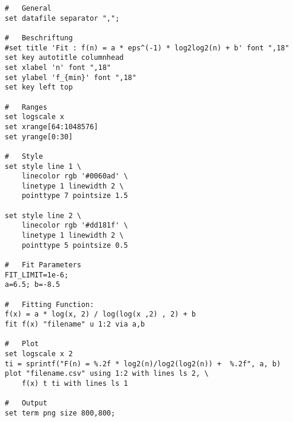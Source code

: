 \begin{lstlisting}[style=gnu]
#	General
set datafile separator ",";

#	Beschriftung
#set title 'Fit : f(n) = a * eps^(-1) * log2log2(n) + b' font ",18"
set key autotitle columnhead
set xlabel 'n' font ",18"
set ylabel 'f_{min}' font ",18"
set key left top

#	Ranges
set logscale x
set xrange[64:1048576]
set yrange[0:30]

#	Style
set style line 1 \
    linecolor rgb '#0060ad' \
    linetype 1 linewidth 2 \
    pointtype 7 pointsize 1.5

set style line 2 \
    linecolor rgb '#dd181f' \
    linetype 1 linewidth 2 \
    pointtype 5 pointsize 0.5

#	Fit Parameters
FIT_LIMIT=1e-6;
a=6.5; b=-8.5

#	Fitting Function:
f(x) = a * log(x, 2) / log(log(x ,2) , 2) + b
fit f(x) "filename" u 1:2 via a,b

#	Plot
set logscale x 2
ti = sprintf("F(n) = %.2f * log2(n)/log2(log2(n)) +  %.2f", a, b)
plot "filename.csv" using 1:2 with lines ls 2, \
	f(x) t ti with lines ls 1

#	Output
set term png size 800,800;
\end{lstlisting}